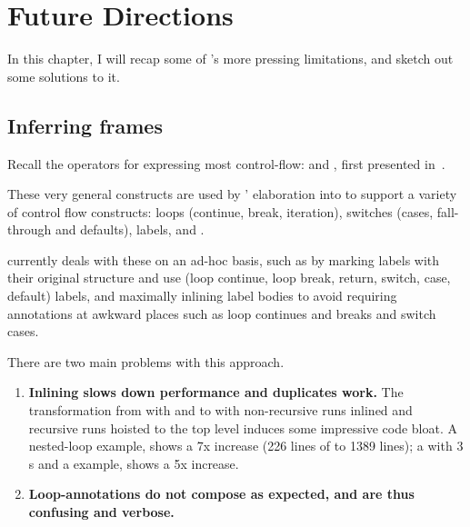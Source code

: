 
\chapter{Future Directions}%
\label{chap:future-directions}

\margintoc{}

In this chapter, I will recap some of 's more pressing limitations, and
sketch out some solutions to it.

\section{Inferring frames}

Recall the  operators for expressing most control-flow:
 and , first presented %
in~.

These very general constructs are used by ' elaboration into
 to support a variety of control flow constructs: loops (continue,
break, iteration), switches (cases, fall-through and defaults), labels, and
.

 currently deals with these on an ad-hoc basis, such as by marking
labels with their original structure and use (loop continue, loop break,
return, switch, case, default) labels, and maximally inlining label bodies to
avoid requiring annotations at awkward places such as loop continues and breaks
and switch cases.

There are two main problems with this approach.

\begin{enumerate}
    \item \textbf{Inlining slows down performance and duplicates
        work.}
        The transformation from  with   %
        and  to  with non-recursive runs %
        inlined and recursive runs hoisted to the top level induces some
        impressive code bloat. A nested-loop
        example,
        shows a 7x increase (226 lines of  to 1389 lines); a
         with 3 s and a 
        example, shows a 5x increase.
    \item \textbf{Loop-annotations do not compose as expected, and are thus confusing and
        verbose.}
\end{enumerate}

